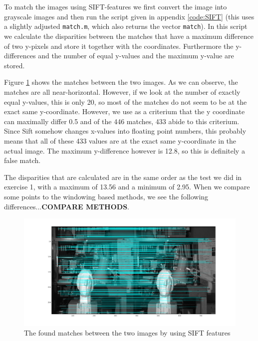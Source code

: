 \documentclass{article}
\begin{document}
\section{}
\section{}
To match the images using SIFT-features we first convert the image into grayscale images and then run the script given in appendix \ref{code:SIFT} (this uses a slightly adjusted \texttt{match.m}, which also returns the vector \texttt{match}). In this script we calculate the disparities between the matches that have a maximum difference of two y-pixels and store it together with the coordinates. Furthermore the y-differences and the number of equal y-values and the maximum y-value are stored.

Figure \ref{matches} shows the matches between the two images. As we can observe, the matches are all near-horizontal. However, if we look at the number of exactly equal y-values, this is only 20, so most of the matches do not seem to be at the exact same y-coordinate. However, we use as a criterium that the y coordinate can maximally differ 0.5 and of the 446 matches, 433 abide to this criterium. Since Sift somehow changes x-values into floating point numbers, this probably means that all of these 433 values are at the exact same y-coordinate in the actual image. The maximum y-difference however is 12.8, so this is definitely a false match.

The disparities that are calculated are in the same order as the test we did in exercise 1, with a maximum of 13.56 and a minimum of 2.95. When we compare some points to the windowing based methods, we see the following differences...\textbf{COMPARE METHODS}.

\begin{figure}
 \centering
 \includegraphics[width = \linewidth]{matches.png}
 \caption{The found matches between the two images by using SIFT features}
 \label{matches}
\end{figure}
\end{document}
